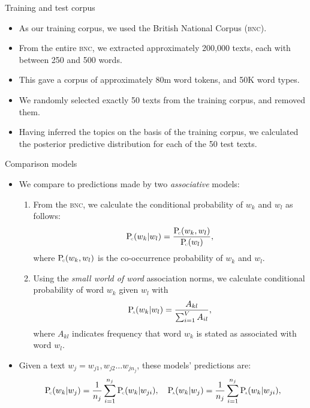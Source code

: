 \documentclass[10pt,ignorenonframetext,]{beamer}
\providecommand{\tightlist}{%
  \setlength{\itemsep}{0pt}\setlength{\parskip}{0pt}}
\newcommand*{\given}{\vert}
\newcommand{\bnc}{\textsc{bnc}\xspace}
\newcommand{\Probc}[1]{\mathrm{P}_{\text{\!\tiny \textsc{c}}}( #1 )}
\newcommand{\Proba}[1]{\mathrm{P}_{\text{\!\tiny \textsc{a}}}( #1 )}
\newcommand{\wnew}{w_{j}}
\begin{document}
\begin{frame}{Training and test corpus}
\protect\hypertarget{training-and-test-corpus}{}

\begin{itemize}
\tightlist
\item
  As our training corpus, we used the British National Corpus (\bnc).
\item
  From the entire \bnc, we extracted approximately 200,000 texts, each
  with between 250 and 500 words.
\item
  This gave a corpus of approximately 80m word tokens, and 50K word
  types.
\item
  We randomly selected exactly 50 texts from the training corpus, and
  removed them.
\item
  Having inferred the topics on the basis of the training corpus, we
  calculated the posterior predictive distribution for each of the 50
  test texts.
\end{itemize}

\end{frame}

\begin{frame}{Comparison models}
\protect\hypertarget{comparison-models}{}

\begin{itemize}
\tightlist
\item
  We compare to predictions made by two \emph{associative} models:

  \begin{enumerate}
  \tightlist
  \item
    From the \bnc, we calculate the conditional probability of \(w_k\)
    and \(w_l\) as follows:
    \[\Probc{w_k \given w_l} = \frac{\Probc{w_k, w_l}}{\Probc{w_l}},\]
    where \(\Probc{w_k, w_l}\) is the co-occurrence probability of
    \(w_k\) and \(w_l\).
  \item
    Using the \emph{small world of word} association norms, we calculate
    conditional probability of word \(w_k\) given \(w_l\) with \[
        \Proba{w_k \given w_l} = \frac{A_{kl}}{\sum_{i=1}^V A_{il}},
        \] where \(A_{kl}\) indicates frequency that word \(w_k\) is
    stated as associated with word \(w_l\).
  \end{enumerate}
\item
  Given a text \(\wnew = w_{j1}, w_{j2} \ldots w_{j n_j}\), these
  models' predictions are: \[
  \Probc{w_k \given \wnew} =\frac{1}{n_j} \sum_{i=1}^{n_{j}} \Probc{w_k \given w_{ji}},\quad
    \Proba{w_k \given \wnew} =\frac{1}{n_j} \sum_{i=1}^{n_{j}} \Proba{w_k \given w_{ji}},
  \]
\end{itemize}

\end{frame}
\end{document}
